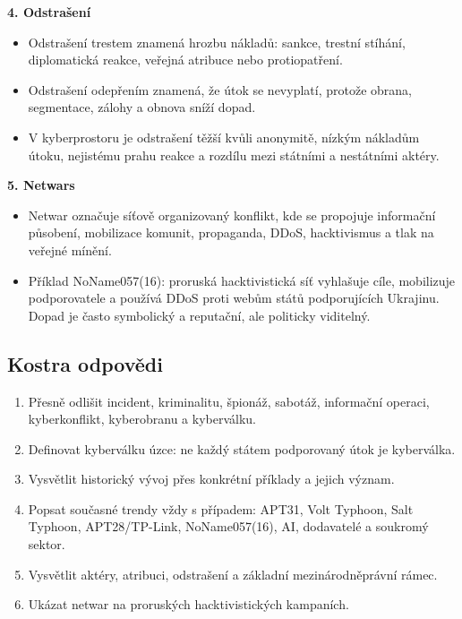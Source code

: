 \documentclass[11pt,a4paper]{article}
\begin{document}
\textbf{4. Odstrašení}
\begin{itemize}
  \item Odstrašení trestem znamená hrozbu nákladů: sankce, trestní stíhání, diplomatická reakce, veřejná atribuce nebo protiopatření.
  \item Odstrašení odepřením znamená, že útok se nevyplatí, protože obrana, segmentace, zálohy a obnova sníží dopad.
  \item V kyberprostoru je odstrašení těžší kvůli anonymitě, nízkým nákladům útoku, nejistému prahu reakce a rozdílu mezi státními a nestátními aktéry.
\end{itemize}

\textbf{5. Netwars}
\begin{itemize}
  \item Netwar označuje síťově organizovaný konflikt, kde se propojuje informační působení, mobilizace komunit, propaganda, DDoS, hacktivismus a tlak na veřejné mínění.
  \item Příklad NoName057(16): proruská hacktivistická síť vyhlašuje cíle, mobilizuje podporovatele a používá DDoS proti webům států podporujících Ukrajinu. Dopad je často symbolický a reputační, ale politicky viditelný.
\end{itemize}

\subsection*{Kostra odpovědi}
\begin{enumerate}
  \item Přesně odlišit incident, kriminalitu, špionáž, sabotáž, informační operaci, kyberkonflikt, kyberobranu a kyberválku.
  \item Definovat kyberválku úzce: ne každý státem podporovaný útok je kyberválka.
  \item Vysvětlit historický vývoj přes konkrétní příklady a jejich význam.
  \item Popsat současné trendy vždy s případem: APT31, Volt Typhoon, Salt Typhoon, APT28/TP-Link, NoName057(16), AI, dodavatelé a soukromý sektor.
  \item Vysvětlit aktéry, atribuci, odstrašení a základní mezinárodněprávní rámec.
  \item Ukázat netwar na proruských hacktivistických kampaních.
\end{enumerate}
\end{document}
